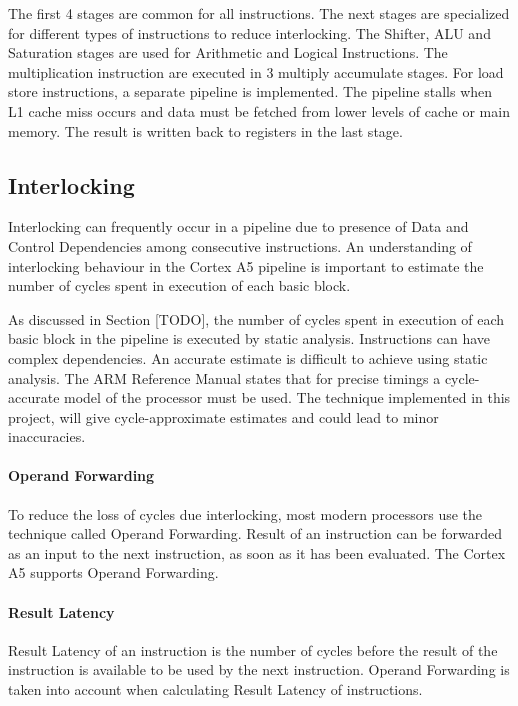 The first 4 stages are common for all instructions. The next stages are specialized for different types of instructions to reduce interlocking. The Shifter, ALU and Saturation stages are used for Arithmetic and Logical Instructions. The multiplication instruction are executed in 3 multiply accumulate stages. For load store instructions, a separate pipeline is implemented. The pipeline stalls when L1 cache miss occurs and data must be fetched from lower levels of cache or main memory. The result is written back to registers in the last stage.

\subsection{Interlocking}
Interlocking can frequently occur in a pipeline due to presence of Data and Control Dependencies among consecutive instructions. An understanding of interlocking behaviour in the Cortex A5 pipeline is important to estimate the number of cycles spent in execution of each basic block. 

As discussed in Section [TODO], the number of cycles spent in execution of each basic block in the pipeline is executed by static analysis. Instructions can have complex dependencies. An accurate estimate is difficult to achieve using static analysis. The ARM Reference Manual \cite{CortexA5TRM} states that for precise timings a cycle-accurate model of the processor must be used. The technique implemented in this project, will give cycle-approximate estimates and could lead to minor inaccuracies.

\vspace*{-10pt}
\paragraph{Operand Forwarding}
To reduce the loss of cycles due interlocking, most modern processors use the technique called Operand Forwarding. Result of an instruction can be forwarded as an input to the next instruction, as soon as it has been evaluated. The Cortex A5 supports Operand Forwarding.

\vspace*{-10pt}
\paragraph{Result Latency}
Result Latency of an instruction is the number of cycles before the result of the instruction is available to be used by the next instruction. Operand Forwarding is taken into account when calculating Result Latency of instructions.

